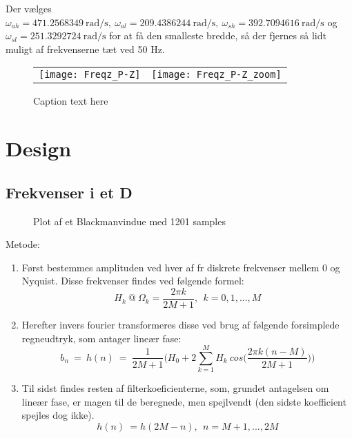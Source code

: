 Der vælges $\omega_{ah}=\SI{471.2568349}{\radian\per\second},\ \omega_{al}=\SI{209.4386244}{\radian\per\second},\ \omega_{sh}=\SI{392.7094616}{\radian\per\second}$ og $\omega_{sl}=\SI{251.3292724}{\radian\per\second}$ for at få den smalleste bredde, så der fjernes så lidt muligt af frekvenserne tæt ved 50 Hz.

\begin{figure}[H]
\centering
\begin{tabular}{c c}
  \texttt{[image: Freqz\_P-Z]}  & \texttt{[image: Freqz\_P-Z\_zoom]} 
\end{tabular}
\caption{Caption text here}
\label{tab:Reference}
\end{figure}

\section{Design}
\subsection{Frekvenser i et D}\label{subsec:FrekD}

\begin{figure}[H]
    \centering
    \scalebox{0.45}{
    }
    \caption{Plot af et Blackmanvindue med 1201 samples}
    \label{fig:Blackman}
\end{figure}

Metode:
\begin{enumerate}
    \item Først bestemmes amplituden ved hver af fr diskrete frekvenser mellem 0 og Nyquist. Disse frekvenser findes ved følgende formel:
    \begin{equation}
       H_k \ @ \  \Omega_k = \frac{2\pi k}{2M+1},\ \ k = 0, 1, ..., M
    \end{equation}
    \item Herefter invers fourier transformeres disse ved brug af følgende forsimplede regneudtryk, som antager lineær fase:
    \begin{equation}
        b_n \ = \ h(n) \ = \ \frac{1}{2M+1}\bigg(H_0 + 2\sum\limits_{k=1}^M H_k \ cos\bigg(\frac{2\pi k(n-M)}{2M+1}\bigg)\bigg)
    \end{equation}
    \item Til sidst findes resten af filterkoeficienterne, som, grundet antagelsen om lineær fase, er magen til de beregnede, men spejlvendt (den sidste koefficient spejles dog ikke).
    \begin{equation}
        h(n) \ = h(2M-n), \ \ n=M+1,...,2M
    \end{equation}
\end{enumerate}

